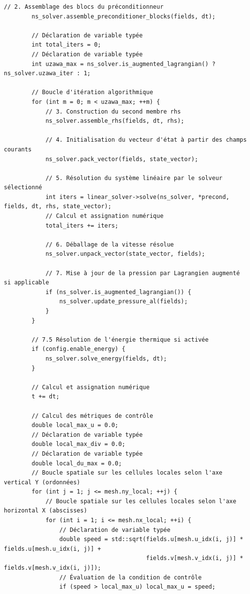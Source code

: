 \documentclass[10pt,a4paper,oneside]{book}
\begin{document}
\begin{lstlisting}[language={[11]C++}]
        // 2. Assemblage des blocs du préconditionneur
        ns_solver.assemble_preconditioner_blocks(fields, dt);

        // Déclaration de variable typée
        int total_iters = 0;
        // Déclaration de variable typée
        int uzawa_max = ns_solver.is_augmented_lagrangian() ? ns_solver.uzawa_iter : 1;

        // Boucle d'itération algorithmique
        for (int m = 0; m < uzawa_max; ++m) {
            // 3. Construction du second membre rhs
            ns_solver.assemble_rhs(fields, dt, rhs);

            // 4. Initialisation du vecteur d'état à partir des champs courants
            ns_solver.pack_vector(fields, state_vector);

            // 5. Résolution du système linéaire par le solveur sélectionné
            int iters = linear_solver->solve(ns_solver, *precond, fields, dt, rhs, state_vector);
            // Calcul et assignation numérique
            total_iters += iters;

            // 6. Déballage de la vitesse résolue
            ns_solver.unpack_vector(state_vector, fields);

            // 7. Mise à jour de la pression par Lagrangien augmenté si applicable
            if (ns_solver.is_augmented_lagrangian()) {
                ns_solver.update_pressure_al(fields);
            }
        }

        // 7.5 Résolution de l'énergie thermique si activée
        if (config.enable_energy) {
            ns_solver.solve_energy(fields, dt);
        }

        // Calcul et assignation numérique
        t += dt;

        // Calcul des métriques de contrôle
        double local_max_u = 0.0;
        // Déclaration de variable typée
        double local_max_div = 0.0;
        // Déclaration de variable typée
        double local_du_max = 0.0;
        // Boucle spatiale sur les cellules locales selon l'axe vertical Y (ordonnées)
        for (int j = 1; j <= mesh.ny_local; ++j) {
            // Boucle spatiale sur les cellules locales selon l'axe horizontal X (abscisses)
            for (int i = 1; i <= mesh.nx_local; ++i) {
                // Déclaration de variable typée
                double speed = std::sqrt(fields.u[mesh.u_idx(i, j)] * fields.u[mesh.u_idx(i, j)] +
                                         fields.v[mesh.v_idx(i, j)] * fields.v[mesh.v_idx(i, j)]);
                // Évaluation de la condition de contrôle
                if (speed > local_max_u) local_max_u = speed;


\end{lstlisting}
\end{document}
